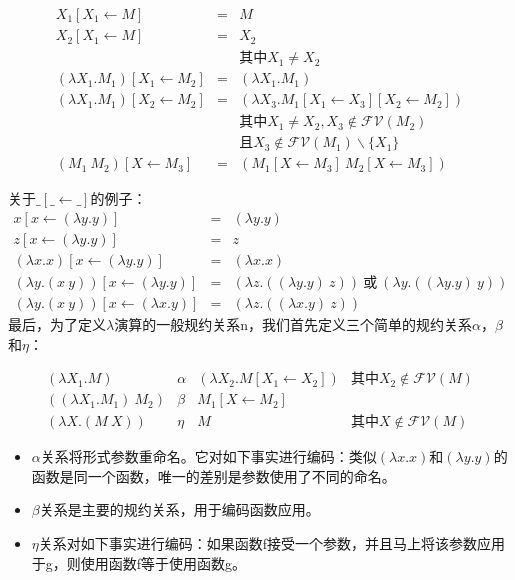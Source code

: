 \documentclass{book}
\begin{document}
\begin{framed}
$$
\begin{array}{lll}
X_1[X_1\leftarrow M] & = & M\\
X_2[X_1\leftarrow M] & = & X_2\\
 & & \text{其中} X_1\neq X_2\\
 (\lambda X_1.M_1)[X_1\leftarrow M_2] & = & (\lambda X_1.M_1) \\
 (\lambda X_1.M_1)[X_2\leftarrow M_2] & = & (\lambda X_3.M_1[X_1\leftarrow X_3][X_2\leftarrow M_2])\\
 & & \text{其中} X_1\neq X_2, X_3 \not\in \mathcal{FV}(M_2)\\
 & & \text{且} X_3\not\in \mathcal{FV}(M_1)\backslash \{X_1\}\\
 (M_1\ M_2)[X\leftarrow M_3] & = & (M_1[X\leftarrow M_3]\ M_2[X\leftarrow M_3])
\end{array}
$$
\end{framed}
关于$\_[\_\leftarrow\_]$的例子：
$$
\begin{array}{lll}
x[x\leftarrow(\lambda y.y)] & = & (\lambda y.y)\\
z[x\leftarrow(\lambda y.y)] & = & z\\
(\lambda x.x)[x\leftarrow(\lambda y.y)] & = & (\lambda x.x)\\
(\lambda y.(x\ y))[x\leftarrow(\lambda y.y)] & = & (\lambda z.((\lambda y.y)\ z))\ \text{或}\ (\lambda y.((\lambda y.y)\ y))\\
(\lambda y.(x\ y))[x\leftarrow(\lambda x.y)] & = & (\lambda z.((\lambda x.y)\ z))
\end{array}
$$
最后，为了定义$\lambda$演算的一般规约关系n，我们首先定义三个简单的规约关系$\alpha$，$\beta$和$\eta$：
\begin{framed}
$$
\begin{array}{llll}
(\lambda X_1.M) & \alpha & (\lambda X_2.M[X_1\leftarrow X_2]) & \text{其中}X_2\not\in \mathcal{FV}(M) \\
((\lambda X_1.M_1)\ M_2) & \beta & M_1[X\leftarrow M_2] & \\
(\lambda X.(M\ X)) & \eta & M & \text{其中}X\not\in \mathcal{FV}(M)
\end{array}
$$
\end{framed}
\begin{itemize}
  \item $\alpha$关系将形式参数重命名。它对如下事实进行编码：类似$(\lambda x.x)$和$(\lambda y.y)$的函数是同一个函数，唯一的差别是参数使用了不同的命名。
  \item $\beta$关系是主要的规约关系，用于编码函数应用。
  \item $\eta$关系对如下事实进行编码：如果函数f接受一个参数，并且马上将该参数应用于g，则使用函数f等于使用函数g。
\end{itemize}
\end{document}
